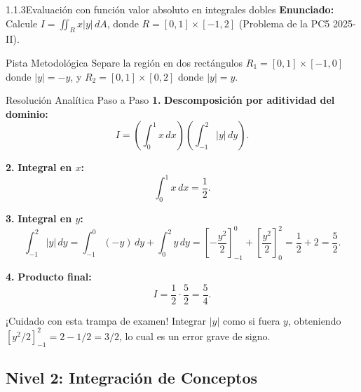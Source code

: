 \documentclass[11pt,a4paper]{article}
\begin{document}
\begin{nivelbox}{1.1.3}{Evaluación con función valor absoluto en integrales dobles}
\textbf{Enunciado:}\\
Calcule $I = \iint_R x |y| \, dA$, donde $R = [0, 1] \times [-1, 2]$ (Problema de la PC5 2025-II).

\begin{observacionbox}{Pista Metodológica}
Separe la región en dos rectángulos $R_1 = [0, 1] \times [-1, 0]$ donde $|y| = -y$, y $R_2 = [0, 1] \times [0, 2]$ donde $|y| = y$.
\end{observacionbox}

\begin{ejerciciobox}{Resolución Analítica Paso a Paso}
\smallskip\noindent\textbf{1.} \textbf{Descomposición por aditividad del dominio:}
\[I = \left( \int_0^1 x \, dx \right) \left( \int_{-1}^2 |y| \, dy \right).\]

\smallskip\noindent\textbf{2.} \textbf{Integral en $x$:}
\[\int_0^1 x \, dx = \frac{1}{2}.\]

\smallskip\noindent\textbf{3.} \textbf{Integral en $y$:}
\[\int_{-1}^2 |y| \, dy = \int_{-1}^0 (-y) \, dy + \int_0^2 y \, dy = \left[ -\frac{y^2}{2} \right]_{-1}^0 + \left[ \frac{y^2}{2} \right]_0^2 = \frac{1}{2} + 2 = \frac{5}{2}.\]

\smallskip\noindent\textbf{4.} \textbf{Producto final:}
\[I = \frac{1}{2} \cdot \frac{5}{2} = \frac{5}{4}.\]
\end{ejerciciobox}

\begin{errorbox}{¡Cuidado con esta trampa de examen!}
Integrar $|y|$ como si fuera $y$, obteniendo $\left[y^2/2\right]_{-1}^2 = 2 - 1/2 = 3/2$, lo cual es un error grave de signo.
\end{errorbox}
\end{nivelbox}
\bigskip

\subsection{Nivel 2: Integración de Conceptos}
\end{document}
